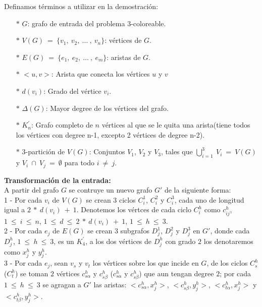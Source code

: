 \documentclass{article}
\begin{document}
Definamos t\'erminos a utilizar en la demostraci\'on: 
\begin{itemize}
    \item[$\ast $] $G$: grafo de entrada del problema 3-coloreable.
    \item[$\ast $] $V(G)~ = ~\{v_1,~ v_2,~ ... ~, ~v_n\}$: v\'ertices de $G$.
    \item[$\ast $] $E(G)~ = ~\{e_1, ~e_2,~ ...~ ,~ e_m\}$: aristas de $G$.
    \item[$\ast $] $<u,v>$: Arista que conecta los v\'ertices $u$ y $v$
    \item[$\ast $] $d(v_i)$: Grado del v\'ertice $v_i$.
    \item[$\ast $] $\Delta(G)$: Mayor degree de los v\'ertices del grafo.
    \item[$\ast $] $K^{'}_n$: Grafo completo de $n$ v\'ertices al que se le quita una arista(tiene todos los v\'ertices con degree n-1, excepto 2 v\'ertices de degree n-2).
    \item[$\ast $] $3$-partici\'on de $V(G)$: Conjuntos $V_1$, $V_2$ y $V_3$, tales que $\bigcup_{i=1}^{3} ~V_i~ = ~V(G)$  y $V_i ~\cap~ V_j~ =~ \emptyset$ para todo $i~ \neq~ j$.
\end{itemize}

\textbf{Transformaci\'on de la entrada:}\\

A partir del grafo $G$ se contruye un nuevo grafo $G'$ de la siguiente forma:\\ 

1 - Por cada $v_i$ de $V(G)$ se crean $3$ ciclos $C_i^1$, $C_i^2$ y $C_i^3$, cada uno de longitud igual a $2 ~*~ d(v_i)~ + ~1$. Denotemos 
los v\'ertces de cada ciclo $C_i^h$ como $c_{ij}^h$, $1~ \leq~i~\leq ~n$, $1~ \leq~d~\leq ~2 ~*~ d(v_i)~ + ~1$, $1~ \leq~h~\leq ~3$.\\ 

2 - Por cada $e_j$ de $E(G)$ se crean $3$ subgrafos $D_{j}^1$, $D_{j}^2$ y $D_{j}^3$ en $G'$, donde cada $D_{j}^h$, $1~ \leq~h~\leq ~3$,  es un $K^{'}_4$, a los dos v\'ertices 
de $D_{j}^h$ con grado $2$ los denotaremos como $x_{j}^h$ y $y_{j}^h$.\\

3 - Por cada $e_j$, sean $v_s$ y $v_t$ los v\'ertices sobre los que incide en $G$, de los ciclos $C_s^h$ ($C_t^h$) se toman $2$ v\'ertices 
$c_{s\alpha}^h$ y $c_{s\beta}^h$ ($c_{s\alpha}^h$ y $c_{s\beta}^h$) que aun tengan degree $2$; por cada $1~\leq ~h ~\leq~ 3$ se agragan a $G'$ las aristas: $<c_{s\alpha}^h, x_{j}^h>$, $<c_{s\beta}^h, y_{j}^h>$, 
$<c_{t\alpha}^h, x_{j}^h>$ y $<c_{t\beta}^h, y_{j}^h>$.\\ 
\end{document}
